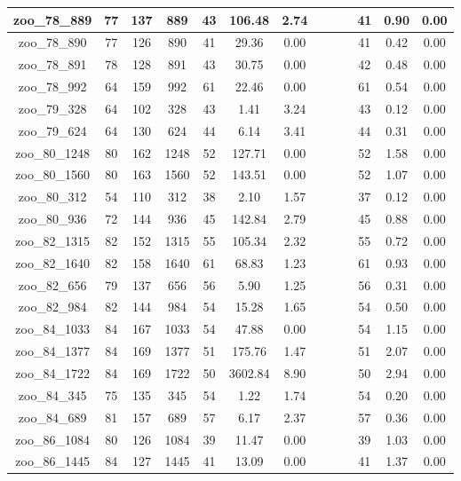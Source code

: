 \begin{landscape}
\begin{longtable}{|c|c|c|c|c|c|c|c|c|c|c|c|c|}
zoo\_78\_889 & 77 & 137 & 889 & 43 & 106.48 & 2.74 &  &  &  & 41 & 0.90 & 0.00 \\ \hline 
zoo\_78\_890 & 77 & 126 & 890 & 41 & 29.36 & 0.00 &  &  &  & 41 & 0.42 & 0.00 \\ \hline 
zoo\_78\_891 & 78 & 128 & 891 & 43 & 30.75 & 0.00 &  &  &  & 42 & 0.48 & 0.00 \\ \hline 
zoo\_78\_992 & 64 & 159 & 992 & 61 & 22.46 & 0.00 &  &  &  & 61 & 0.54 & 0.00 \\ \hline 
zoo\_79\_328 & 64 & 102 & 328 & 43 & 1.41 & 3.24 &  &  &  & 43 & 0.12 & 0.00 \\ \hline 
zoo\_79\_624 & 64 & 130 & 624 & 44 & 6.14 & 3.41 &  &  &  & 44 & 0.31 & 0.00 \\ \hline 
zoo\_80\_1248 & 80 & 162 & 1248 & 52 & 127.71 & 0.00 &  &  &  & 52 & 1.58 & 0.00 \\ \hline 
zoo\_80\_1560 & 80 & 163 & 1560 & 52 & 143.51 & 0.00 &  &  &  & 52 & 1.07 & 0.00 \\ \hline 
zoo\_80\_312 & 54 & 110 & 312 & 38 & 2.10 & 1.57 &  &  &  & 37 & 0.12 & 0.00 \\ \hline 
zoo\_80\_936 & 72 & 144 & 936 & 45 & 142.84 & 2.79 &  &  &  & 45 & 0.88 & 0.00 \\ \hline 
zoo\_82\_1315 & 82 & 152 & 1315 & 55 & 105.34 & 2.32 &  &  &  & 55 & 0.72 & 0.00 \\ \hline 
zoo\_82\_1640 & 82 & 158 & 1640 & 61 & 68.83 & 1.23 &  &  &  & 61 & 0.93 & 0.00 \\ \hline 
zoo\_82\_656 & 79 & 137 & 656 & 56 & 5.90 & 1.25 &  &  &  & 56 & 0.31 & 0.00 \\ \hline 
zoo\_82\_984 & 82 & 144 & 984 & 54 & 15.28 & 1.65 &  &  &  & 54 & 0.50 & 0.00 \\ \hline 
zoo\_84\_1033 & 84 & 167 & 1033 & 54 & 47.88 & 0.00 &  &  &  & 54 & 1.15 & 0.00 \\ \hline 
zoo\_84\_1377 & 84 & 169 & 1377 & 51 & 175.76 & 1.47 &  &  &  & 51 & 2.07 & 0.00 \\ \hline 
zoo\_84\_1722 & 84 & 169 & 1722 & 50 & 3602.84 & 8.90 &  &  &  & 50 & 2.94 & 0.00 \\ \hline 
zoo\_84\_345 & 75 & 135 & 345 & 54 & 1.22 & 1.74 &  &  &  & 54 & 0.20 & 0.00 \\ \hline 
zoo\_84\_689 & 81 & 157 & 689 & 57 & 6.17 & 2.37 &  &  &  & 57 & 0.36 & 0.00 \\ \hline 
zoo\_86\_1084 & 80 & 126 & 1084 & 39 & 11.47 & 0.00 &  &  &  & 39 & 1.03 & 0.00 \\ \hline 
zoo\_86\_1445 & 84 & 127 & 1445 & 41 & 13.09 & 0.00 &  &  &  & 41 & 1.37 & 0.00 \\ \hline 

\end{longtable}
\end{landscape}
